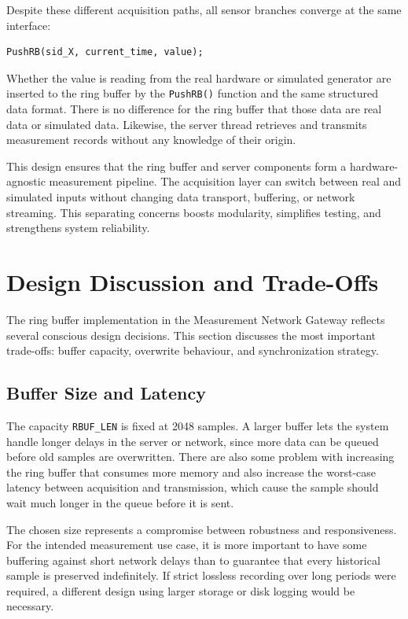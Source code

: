 Despite these different acquisition paths, all sensor branches converge at the same interface:
\begin{verbatim}
PushRB(sid_X, current_time, value);
\end{verbatim}
Whether the value is reading from the real hardware or simulated generator are inserted to the ring buffer by the \texttt{PushRB()} function and the same structured data format. There is no difference for the ring buffer that those data are real data or simulated data. Likewise, the server thread retrieves and transmits measurement records without any knowledge of their origin.

This design ensures that the ring buffer and server components form a hardware-agnostic measurement pipeline. The acquisition layer can switch between real and simulated inputs without changing data transport, buffering, or network streaming. This separating concerns boosts modularity, simplifies testing, and strengthens system reliability.

\section{Design Discussion and Trade-Offs}
The ring buffer implementation in the Measurement Network Gateway reflects several conscious design decisions. This section discusses the most important trade-offs: buffer capacity, overwrite behaviour, and synchronization strategy.

\subsection{Buffer Size and Latency}
The capacity \texttt{RBUF\_LEN} is fixed at 2048 samples. A larger buffer lets the system handle longer delays in the server or network, since more data can be queued before old samples are overwritten. There are also some problem with increasing the ring buffer that consumes more memory and also increase the worst-case latency between acquisition and transmission, which cause the sample should wait much longer in the queue before it is sent.

The chosen size represents a compromise between robustness and responsiveness. For the intended measurement use case, it is more important to have some buffering against short network delays than to guarantee that every historical sample is preserved indefinitely. If strict lossless recording over long periods were required, a different design using larger storage or disk logging would be necessary.

